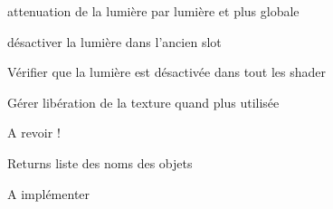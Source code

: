 
\begin{DoxyRefList}
\item[\label{todo__todo000001}%
\hypertarget{todo__todo000001}{}%
Class \hyperlink{class_light}{Light} ]attenuation de la lumière par lumière et plus globale  
\item[\label{todo__todo000003}%
\hypertarget{todo__todo000003}{}%
Member \hyperlink{class_light_a985e67a0b88ba49ec8da5d5b205d06ed}{Light\+:\+:set\+Number} (char num)]désactiver la lumière dans l'ancien slot  
\item[\label{todo__todo000002}%
\hypertarget{todo__todo000002}{}%
Member \hyperlink{class_light_ad0e59fad13bb6cfadc25b2c477e9ddc7}{Light\+:\+:$\sim$\+Light} ()]Vérifier que la lumière est désactivée dans tout les shader  
\item[\label{todo__todo000004}%
\hypertarget{todo__todo000004}{}%
Member \hyperlink{class_material_a2c19452d71f54075df8f5405b03129f4}{Material\+:\+:$\sim$\+Material} ()]Gérer libération de la texture quand plus utilisée  
\item[\label{todo__todo000005}%
\hypertarget{todo__todo000005}{}%
Member \hyperlink{class_piece_a029823aa5135b356a9e4da14578db4e8}{Piece\+:\+:get\+Children} () const ]A revoir ! \begin{DoxyReturn}{Returns}
liste des noms des objets  
\end{DoxyReturn}

\item[\label{todo__todo000006}%
\hypertarget{todo__todo000006}{}%
Member \hyperlink{class_scene_ae87e88cbefc16640354acc8ec11b5e1e}{Scene\+:\+:save\+As\+X\+M\+L} (const Q\+String \&file\+Name)]A implémenter 
\end{DoxyRefList}